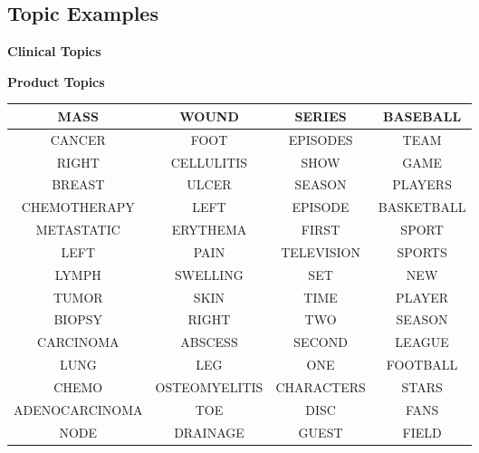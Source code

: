 
\subsection{Topic Examples}
\begin{multicols}{2}
\begin{center}
\textbf{Clinical Topics}
\end{center}
\begin{center}
\textbf{Product Topics}
\end{center}
\end{multicols}

\begin{small}
\begin{tabular}{|c|c|c|c|}
\hline 
MASS & WOUND & SERIES & BASEBALL\tabularnewline
\hline 
CANCER & FOOT & EPISODES & TEAM\tabularnewline
\hline 
RIGHT & CELLULITIS & SHOW & GAME\tabularnewline
\hline 
BREAST & ULCER & SEASON & PLAYERS\tabularnewline
\hline 
CHEMOTHERAPY & LEFT & EPISODE & BASKETBALL\tabularnewline
\hline 
METASTATIC & ERYTHEMA & FIRST & SPORT\tabularnewline
\hline 
LEFT & PAIN & TELEVISION & SPORTS\tabularnewline
\hline 
LYMPH & SWELLING & SET & NEW\tabularnewline
\hline 
TUMOR & SKIN & TIME & PLAYER\tabularnewline
\hline 
BIOPSY & RIGHT & TWO & SEASON\tabularnewline
\hline 
CARCINOMA & ABSCESS & SECOND & LEAGUE\tabularnewline
\hline 
LUNG & LEG & ONE & FOOTBALL\tabularnewline
\hline 
CHEMO & OSTEOMYELITIS & CHARACTERS & STARS\tabularnewline
\hline 
ADENOCARCINOMA & TOE & DISC & FANS\tabularnewline
\hline 
NODE & DRAINAGE & GUEST & FIELD\tabularnewline
\hline
\end{tabular}
\end{small}
